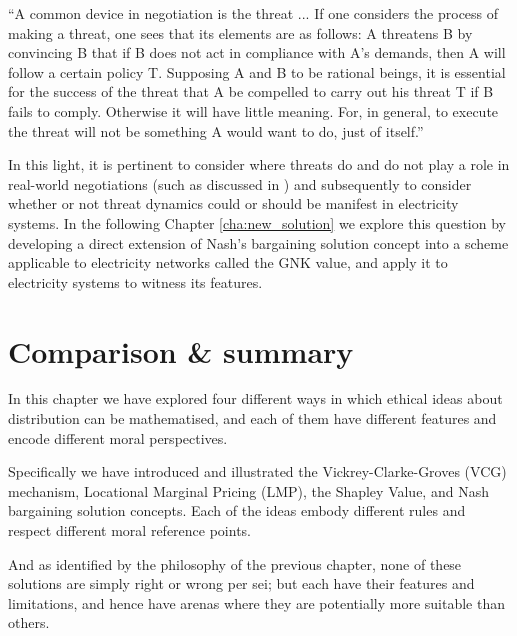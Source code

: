 \begin{displayquote}
``A common device in negotiation is the threat ... If one considers the process of making a threat, one sees that its elements are as follows: A threatens B by convincing B that if B does not act in compliance with A's demands, then A will follow a certain policy T. Supposing A and B to be rational beings, it is essential for the success of the threat that A be compelled to carry out his threat T if B fails to comply. Otherwise it will have little meaning. For, in general, to execute the threat will not be something A would want to do, just of itself.''
\citep{nash2}
\end{displayquote}

In this light, it is pertinent to consider where threats do and do not play a role in real-world negotiations (such as discussed in \cite{anbarci2002comparing}) and subsequently to consider whether or not threat dynamics could or should be manifest in electricity systems.
In the following Chapter \ref{cha:new_solution} we explore this question by developing a direct extension of Nash's bargaining solution concept into a scheme applicable to electricity networks called the GNK value, and apply it to electricity systems to witness its features.%



\section{Comparison \& summary}

In this chapter we have explored four different ways in which ethical ideas about distribution can be mathematised, and each of them have different features and encode different moral perspectives.

Specifically we have introduced and illustrated the Vickrey-Clarke-Groves (VCG) mechanism, Locational Marginal Pricing (LMP), the Shapley Value, and Nash bargaining solution concepts.
Each of the ideas embody different rules and respect different moral reference points.

And as identified by the philosophy of the previous chapter, none of these solutions are simply right or wrong per sei; but each have their features and limitations, and hence have arenas where they are potentially more suitable than others.

